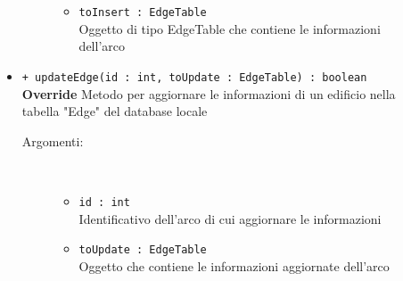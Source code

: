 \documentclass[../DefinizioneDiProdotto.tex]{subfiles}
\begin{document}
\begin{description}
\begin{itemize}
\begin{description}
\begin{itemize}
				\item \texttt{toInsert : EdgeTable}\\
				Oggetto di tipo EdgeTable che contiene le informazioni dell'arco\end{itemize}
		\end{description}
		\item \texttt{+ updateEdge(id : int, toUpdate : EdgeTable) : boolean}\\
		\textbf{Override} Metodo per aggiornare le informazioni di un edificio nella tabella "Edge" del database locale
		\begin{description}
			\item[Argomenti:] \
			\begin{itemize}
				\item \texttt{id : int}\\
				Identificativo dell'arco di cui aggiornare le informazioni\item \texttt{toUpdate : EdgeTable}\\
				Oggetto che contiene le informazioni aggiornate dell'arco\end{itemize}
		\end{description}
	\end{itemize}
\end{description}
\end{document}
